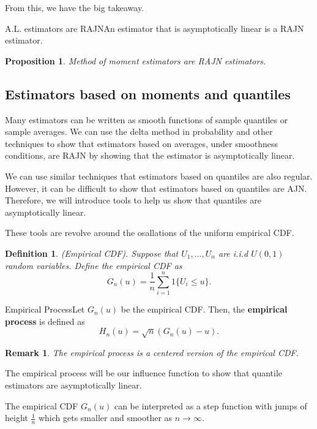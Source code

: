 \documentclass[twoside]{article}
\newtheorem{proposition}[theorem]{Proposition}
\newtheorem{definition}[theorem]{Definition}
\newtheorem{remark}[theorem]{Remark}
\begin{document}
From this, we have the big takeaway.

\begin{proposition_exam}{A.L. estimators are RAJN}{}An estimator that is asymptotically linear is a RAJN estimator.
\end{proposition_exam}



\begin{proposition}Method of moment estimators are RAJN estimators.
\end{proposition}

\subsection{Estimators based on moments and quantiles}
Many estimators can be written as smooth functions of sample quantiles or sample averages. We can use the delta method in probability and other techniques to show that estimators based on averages, under smoothness conditions, are RAJN by showing that the estimator is asymptotically linear.

We can use similar techniques that estimators based on quantiles are also regular. However, it can be difficult to show that estimators based on quantiles are AJN. Therefore, we will introduce tools to help us show that quantiles are asymptotically linear.


These tools are revolve around the osallations of the uniform empirical CDF.

\begin{definition}(Empirical CDF). Suppose that $U_1,...,U_n$ are i.i.d $U(0,1)$ random variables. Define the empirical CDF as 
$$
G_n(u) = \frac{1}{n}\sum_{i=1}^{n}1\{U_i \leq u\}.
$$
\end{definition}

\begin{definition_exam}{Empirical Process}{}Let $G_n(u)$ be the empirical CDF. Then, the \textbf{empirical process} is defined as 
$$
H_n(u) = \sqrt{n}(G_n(u) - u).
$$
\end{definition_exam}

\begin{remark}The empirical process is a centered version of the empirical CDF.
\end{remark}

The empirical process will be our influence function to show that quantile estimators are asymptotically linear.

The empirical CDF $G_n(u)$ can be interpreted as a step function with jumps of height $\frac{1}{n}$ which gets smaller and smoother as $n \rightarrow \infty.$
\end{document}
